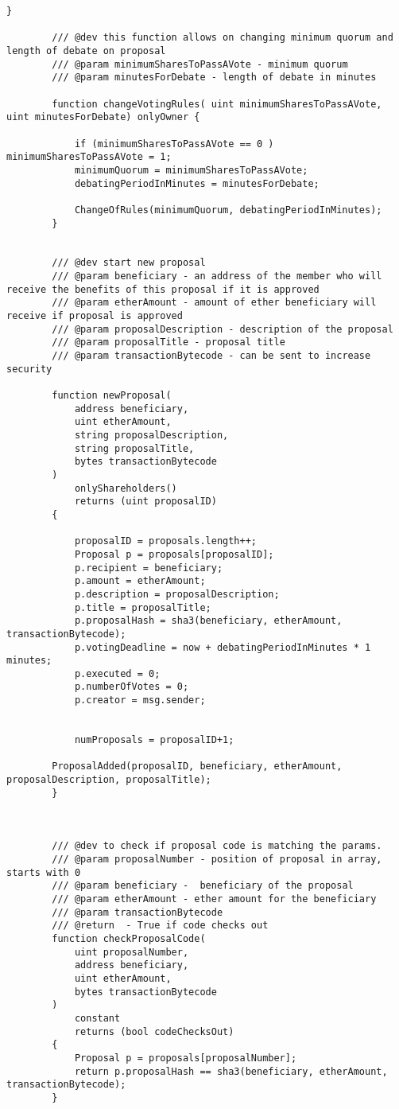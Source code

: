 \documentclass{article}
\begin{document}
\begin{lstlisting}[style=MyCStyle]
        }

        /// @dev this function allows on changing minimum quorum and length of debate on proposal
        /// @param minimumSharesToPassAVote - minimum quorum
        /// @param minutesForDebate - length of debate in minutes

        function changeVotingRules( uint minimumSharesToPassAVote, uint minutesForDebate) onlyOwner {

            if (minimumSharesToPassAVote == 0 ) minimumSharesToPassAVote = 1;
            minimumQuorum = minimumSharesToPassAVote;
            debatingPeriodInMinutes = minutesForDebate;

            ChangeOfRules(minimumQuorum, debatingPeriodInMinutes);
        }


        /// @dev start new proposal
        /// @param beneficiary - an address of the member who will receive the benefits of this proposal if it is approved
        /// @param etherAmount - amount of ether beneficiary will receive if proposal is approved
        /// @param proposalDescription - description of the proposal
        /// @param proposalTitle - proposal title
        /// @param transactionBytecode - can be sent to increase security

        function newProposal(
            address beneficiary,
            uint etherAmount,
            string proposalDescription,
            string proposalTitle,
            bytes transactionBytecode
        )
            onlyShareholders()
            returns (uint proposalID)
        {

            proposalID = proposals.length++;
            Proposal p = proposals[proposalID];
            p.recipient = beneficiary;
            p.amount = etherAmount;
            p.description = proposalDescription;
            p.title = proposalTitle;
            p.proposalHash = sha3(beneficiary, etherAmount, transactionBytecode);
            p.votingDeadline = now + debatingPeriodInMinutes * 1 minutes;
            p.executed = 0;
            p.numberOfVotes = 0;
            p.creator = msg.sender;


            numProposals = proposalID+1;

        ProposalAdded(proposalID, beneficiary, etherAmount, proposalDescription, proposalTitle);
        }



        /// @dev to check if proposal code is matching the params.
        /// @param proposalNumber - position of proposal in array, starts with 0
        /// @param beneficiary -  beneficiary of the proposal
        /// @param etherAmount - ether amount for the beneficiary
        /// @param transactionBytecode
        /// @return  - True if code checks out
        function checkProposalCode(
            uint proposalNumber,
            address beneficiary,
            uint etherAmount,
            bytes transactionBytecode
        )
            constant
            returns (bool codeChecksOut)
        {
            Proposal p = proposals[proposalNumber];
            return p.proposalHash == sha3(beneficiary, etherAmount, transactionBytecode);
        }



\end{lstlisting}
\end{document}
